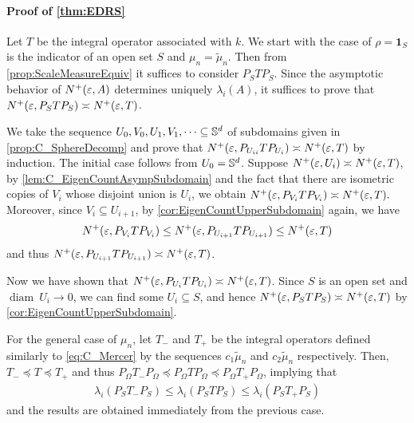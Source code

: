 \paragraph{Proof of \cref{thm:EDRS}}
Let $T$ be the integral operator associated with $k$.
We start with the case of $\rho = \bm{1}_{S}$ is the indicator of an open set $S$ and $\mu_n = \tilde{\mu}_n$.
Then from \cref{prop:ScaleMeasureEquiv} it suffices to consider $P_S T P_S$.
Since the asymptotic behavior of $N^+(\varepsilon,A)$ determines uniquely $\lambda_i(A)$,
it suffices to prove that $N^+(\varepsilon,P_{S} T P_{S}) \asymp N^+(\varepsilon,T)$.

We take the sequence $U_0,V_0,U_1,V_1,\dots \subseteq \mathbb{S}^d$ of subdomains given in \cref{prop:C_SphereDecomp}
and prove that $N^+(\varepsilon,P_{U_{ii}} T P_{U_{i}}) \asymp N^+(\varepsilon,T)$ by induction.
The initial case follows from $U_0 = \mathbb{S}^d$.
Suppose $N^+(\varepsilon,U_i) \asymp N^+(\varepsilon,T)$, by \cref{lem:C_EigenCountAsympSubdomain}
and the fact that there are isometric copies of $V_i$ whose disjoint union is $U_i$, we obtain
$N^+(\varepsilon,P_{V_i} T P_{V_i}) \asymp N^+(\varepsilon,T).$
Moreover, since $V_i \subseteq U_{i+1}$, by \cref{cor:EigenCountUpperSubdomain} again,
we have
\begin{align*}
  N^+(\varepsilon,P_{V_i} T P_{V_i}) \leq N^+(\varepsilon,P_{U_{i+1}} T P_{U_{i+1}}) \leq N^+(\varepsilon,T)
\end{align*}
and thus $N^+(\varepsilon,P_{U_{i+1}} T P_{U_{i+1}}) \asymp N^+(\varepsilon,T)$.

Now we have shown that $N^+(\varepsilon,P_{U_i} T P_{U_{i}}) \asymp N^+(\varepsilon,T)$.
Since $S$ is an open set and $\operatorname{diam}~U_i \to 0$,
we can find some $U_i \subseteq S$, and hence
$N^+(\varepsilon,P_{S} T P_{S}) \asymp N^+(\varepsilon,T) $ by \cref{cor:EigenCountUpperSubdomain}.

For the general case of $\mu_n$,
let $T_-$ and $T_+$ be the integral operators defined similarly to \cref{eq:C_Mercer} by the sequences
$c_1 \tilde{\mu}_n$ and $c_2 \tilde{\mu}_n$ respectively.
Then, $T_- \preceq T \preceq T_+$ and thus $P_{\Omega} T_- P_{\Omega}\preceq P_{\Omega} T P_{\Omega} \preceq P_{\Omega} T_+ P_{\Omega}$,
implying that
\begin{align*}
  \lambda_i\left(P_{S} T_- P_{S}\right)
  \leq \lambda_i\left(P_{S} T P_{S}\right)
  \leq \lambda_i\left(P_{S} T_+ P_{S}\right)
\end{align*}
and the results are obtained immediately from the previous case.


